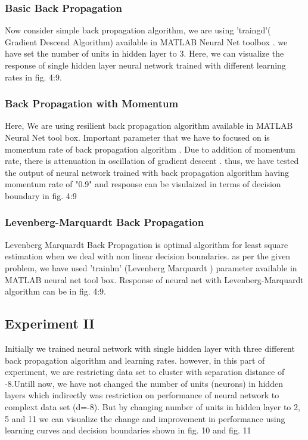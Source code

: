 \documentclass[conference]{IEEEtran}
\begin{document}
\subsubsection{Basic Back Propagation}
 Now consider simple back propagation algorithm, we are using 'traingd'( Gradient Descend Algorithm)\cite{mgd} available in MATLAB Neural Net toolbox \cite{bpm}. we have set the number of units in hidden layer to 3. Here, we can visualize the response of single hidden layer neural network trained with different learning rates in fig. 4:9.
 \\
\subsubsection{Back Propagation with Momentum}
Here, We are using resilient back propagation algorithm available in MATLAB Neural Net tool box. Important parameter that we have to focused on is momentum rate of back propagation algorithm\cite{gdm} \cite{mgdm}. Due to addition of momentum rate, there is attenuation in oscillation of gradient descent \cite{gdm} . thus, we have tested the output of neural network trained with back propagation algorithm having momentum rate of "0.9" and response can be visulaized in terms of decision boundary in fig. 4:9\\

\subsubsection{Levenberg-Marquardt Back Propagation}
Levenberg Marquardt Back Propagation is optimal algorithm for least square estimation when we deal with non linear decision boundaries\cite{lm}. as per the given problem, we have used 'trainlm' (Levenberg Marquardt ) \cite{mlm} parameter available in MATLAB neural net tool box. Response of neural net with  Levenberg-Marquardt algorithm can be in fig. 4:9.

\subsection{Experiment II}
{ Initially we trained neural network with single hidden layer with three different back propagation algorithm and learning rates. however, in this part of experiment, we are restricting data set to cluster with separation distance of -8.Untill now, we have not changed the number of units (neurons) in hidden layers which indirectly was restriction on performance of neural network to complext data set (d=-8). But by changing  number of  units in hidden layer to 2, 5 and 11 we can visualize the change and improvement in performance using learning curves and decision boundaries shown in fig. 10 and fig. 11   }
\FloatBarrier
\end{document}
